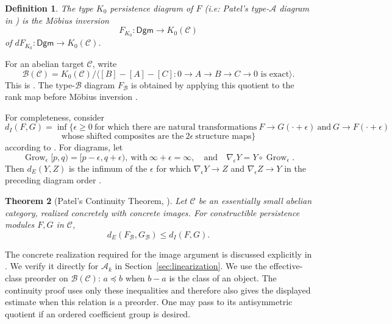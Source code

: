 \documentclass{amsart}
\newtheorem{theorem}{Theorem}[section]
\newtheorem{definition}[theorem]{Definition}
\begin{document}
\begin{definition}
The \textit{type $K_0$ persistence diagram} of $F$ (i.e: Patel's type-$\mathcal A$ diagram in \cite[Definition~7.1]{patel2016generalized}) is the Möbius inversion
$$ F_{K_0} \colon \mathsf{Dgm} \to K_0(\mathcal{C}) $$
of $dF_{K_0} \colon \mathsf{Dgm} \to K_0(\mathcal{C})$.
\end{definition}

For an abelian target $\mathcal C$, write
\[
\mathcal B(\mathcal C)=K_0(\mathcal C)/
\langle [B]-[A]-[C]:0\to A\to B\to C\to0\text{ is exact}\rangle.
\]
This is \cite[Definition~6.2.1]{patel2016generalized}. The type-$\mathcal B$ diagram $F_{\mathcal B}$ is obtained by applying this quotient to the rank map before M\"obius inversion \cite[Definition~7.2]{patel2016generalized}.

For completeness, consider \[d_I(F,G)=\inf\{\epsilon\geq0 \ \mbox{for which there are natural transformations} \  F\to G(\cdot+\epsilon)  \ \mbox{and} \  G\to F(\cdot+\epsilon) \]\[ \mbox{whose shifted composites are the}  \ 2\epsilon \ \mbox{structure maps}\}\] according to \cite[Definitions~3.1--3.2]{patel2016generalized}. For diagrams, let \[\operatorname{Grow}_\epsilon[p,q)=[p-\epsilon,q+\epsilon), \  \mbox{with} \ \infty+\epsilon=\infty, \quad \mbox{and} \quad \nabla_\epsilon Y=Y\circ\operatorname{Grow}_\epsilon.\] Then $d_E(Y,Z)$ is the infimum of the $\epsilon$ for which $\nabla_\epsilon Y\to Z$ and $\nabla_\epsilon Z\to Y$ in the preceding diagram order \cite[Definitions~5.2--5.3]{patel2016generalized}.

\begin{theorem}[{Patel's Continuity Theorem, \cite[Theorem~8.2, p.~416]{patel2016generalized}}]\label{stability}
Let $\mathcal C$ be an essentially small abelian category, realized concretely with concrete images. For constructible persistence modules $F,G$ in $\mathcal C$,
\[
d_E(F_{\mathcal B},G_{\mathcal B})\leq d_I(F,G).
\]
\end{theorem}
The concrete realization required for the image argument is discussed explicitly in \cite[Section~8, p.~413]{patel2016generalized}. We verify it directly for $\mathcal A_k$ in Section~\ref{sec:linearization}.
We use the effective-class preorder on $\mathcal B(\mathcal C)$: $a\preceq b$ when $b-a$ is the class of an object. The continuity proof uses only these inequalities and therefore also gives the displayed estimate when this relation is a preorder. One may pass to its antisymmetric quotient if an ordered coefficient group is desired.
\end{document}

